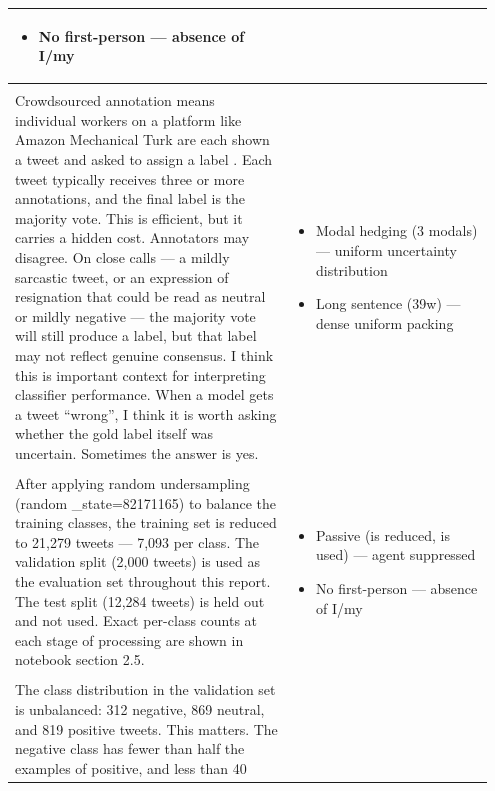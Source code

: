 \documentclass[11pt]{article}
\begin{document}
\begin{longtable}{|p{0.55\linewidth}|p{0.40\linewidth}|}
\begin{itemize}[leftmargin=1em,itemsep=1pt,topsep=1pt,parsep=0pt]
  \item No first-person --- absence of I/my
\end{itemize} \\[2pt]
\hline
\rule{0pt}{3.5cm} & \\
\hline
Crowdsourced annotation means individual workers on a platform like Amazon Mechanical Turk are each shown a tweet and asked to assign a label . Each tweet typically receives three or more annotations, and the final label is the majority vote. This is efficient, but it carries a hidden cost. Annotators may disagree. On close calls --- a mildly sarcastic tweet, or an expression of resignation that could be read as neutral or mildly negative --- the majority vote will still produce a label, but that label may not reflect genuine consensus. I think this is important context for interpreting classifier performance. When a model gets a tweet ``wrong'', I think it is worth asking whether the gold label itself was uncertain. Sometimes the answer is yes. & \begin{itemize}[leftmargin=1em,itemsep=1pt,topsep=1pt,parsep=0pt]
  \item Modal hedging (3 modals) --- uniform uncertainty distribution
  \item Long sentence (39w) --- dense uniform packing
\end{itemize} \\[2pt]
\hline
\rule{0pt}{3.5cm} & \\
\hline
After applying random undersampling (random \_state=82171165) to balance the training classes, the training set is reduced to 21,279 tweets --- 7,093 per class. The validation split (2,000 tweets) is used as the evaluation set throughout this report. The test split (12,284 tweets) is held out and not used. Exact per-class counts at each stage of processing are shown in notebook section 2.5. & \begin{itemize}[leftmargin=1em,itemsep=1pt,topsep=1pt,parsep=0pt]
  \item Passive (is reduced, is used) --- agent suppressed
  \item No first-person --- absence of I/my
\end{itemize} \\[2pt]
\hline
\rule{0pt}{3.5cm} & \\
\hline
The class distribution in the validation set is unbalanced: 312 negative, 869 neutral, and 819 positive tweets. This matters. The negative class has fewer than half the examples of positive, and less than 40 & \begin{itemize}[leftmargin=1em,itemsep=1pt,topsep=1pt,parsep=0pt]

\end{itemize}
\end{longtable}
\end{document}
